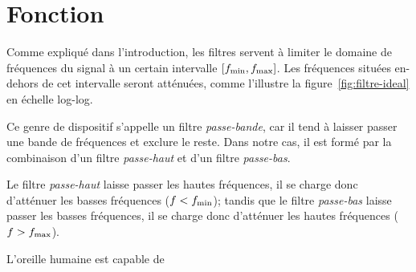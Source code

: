 \section{Fonction}

Comme expliqué dans l'introduction, les filtres servent à limiter
le domaine de fréquences du signal à un certain intervalle
$[f_{\mathrm{min}},f_{\mathrm{max}}]$.
Les fréquences situées en-dehors de cet intervalle seront atténuées,
comme l'illustre la figure~\ref{fig:filtre-ideal} en échelle log-log.

Ce genre de dispositif s'appelle un filtre \emph{passe-bande},
car il tend à laisser passer une bande de fréquences et exclure le reste.
Dans notre cas, il est formé par la combinaison d'un filtre
\emph{passe-haut} et d'un filtre \emph{passe-bas}.

Le filtre \emph{passe-haut} laisse passer les hautes fréquences,
il se charge donc d'atténuer les basses fréquences ($f<f_{\mathrm{min}}$);
tandis que le filtre \emph{passe-bas} laisse passer les basses fréquences,
il se charge donc d'atténuer les hautes fréquences ($f>f_{\mathrm{max}}$).

L'oreille humaine est capable de
